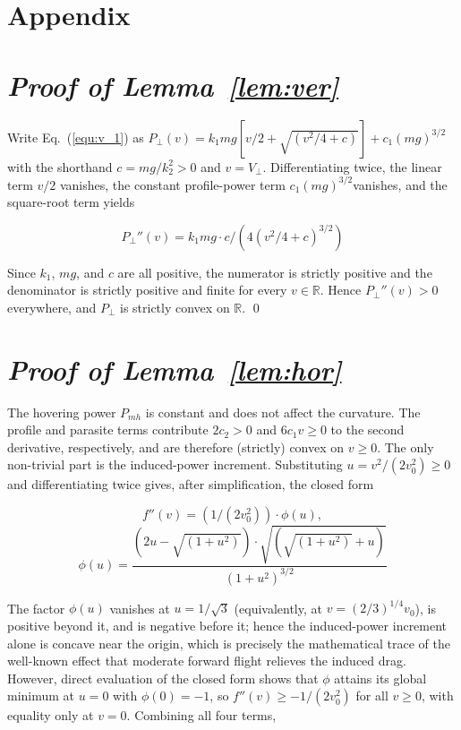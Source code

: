 \appendix
\section*{Appendix}
\section{\textit{Proof of Lemma~\ref{lem:ver}}}
\label{pro:Lemma ver}

Write Eq.~(\ref{equ:v_1}) as $P_\perp(v) = k_1mg[v/2 + \sqrt{(v^2/4 + c)}] + c_1(mg)^{3/2}$ with the shorthand $c = mg/k_2^2 > 0$ and $v = V_\perp$.
Differentiating twice, the linear term $v/2$ vanishes, the constant profile-power term $c_1(mg)^{3/2} $vanishes, and the square-root term yields

    \[ P_\perp ''(v) = k_1mg \cdot c / (4(v^2/4 + c)^{3/2}) \]

    Since $k_1$, $mg$, and $c$ are all positive, the numerator is strictly positive and the denominator is strictly positive and finite for every $v \in \mathbb{R} $.
    Hence $P_\perp''(v) > 0$ everywhere, and $P_\perp$ is strictly convex on $\mathbb{R}$.
    \qed

\section{\textit{Proof of Lemma~\ref{lem:hor}}}
\label{pro:Lemma hor}
The hovering power $P_{mh}$ is constant and does not affect the curvature.
The profile and parasite terms contribute $2c_2 > 0$ and $6c_1v \geq 0$ to the second derivative, respectively, and are therefore (strictly) convex on $v \geq 0$.
The only non-trivial part is the induced-power increment.
Substituting $u = v^2/(2v_0^2) \geq 0$ and differentiating twice gives, after simplification, the closed form

    \[ f''(v) = (1/(2v_0^2)) \cdot \phi(u),\]
    \[ \phi(u) = \frac{(2u - \sqrt{(1+u^2)}) \cdot \sqrt{(\sqrt{(1+u^2)} + u)} }{ (1+u^2)^{3/2}} \]

    The factor $\phi(u)$ vanishes at $u = 1/\sqrt{3}$ (equivalently, at $v = (2/3)^{1/4}v_0$), is positive beyond it, and is negative before it; hence the induced-power increment alone is concave near the origin, which is precisely the mathematical trace of the well-known effect that moderate forward flight relieves the induced drag.
    However, direct evaluation of the closed form shows that $\phi$ attains its global minimum at $u = 0$ with $\phi(0) = -1$, so $f''(v) \geq -1/(2v_0^2)$ for all $v \geq 0$, with equality only at $v = 0$.
    Combining all four terms,

